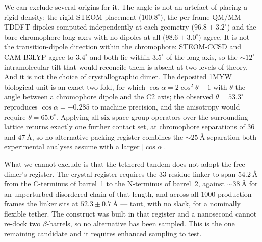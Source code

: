 \documentclass[journal=jpcbfk, manuscript=article, layout=twocolumn, doi=true]{achemso}
\begin{document}
We can exclude several origins for it. The angle is not an artefact of placing
a rigid density: the rigid STEOM placement ($100.8^{\circ}$), the per-frame
QM/MM TDDFT dipoles computed independently at each geometry
($96.8 \pm 3.2^{\circ}$) and the bare chromophore long axes with no dipoles at
all ($98.6 \pm 3.0^{\circ}$) agree. It is not the transition-dipole direction
within the chromophore: STEOM-CCSD and CAM-B3LYP agree to $3.4^{\circ}$ and
both lie within $3.5^{\circ}$ of the long axis, so the $\sim\!12^{\circ}$
intramolecular tilt that would reconcile them is absent at two levels of
theory. And it is not the choice of crystallographic dimer. The deposited
1MYW biological unit is an exact two-fold, for which
$\cos\alpha = 2\cos^{2}\theta - 1$ with $\theta$ the angle between a
chromophore dipole and the C2 axis; the observed $\theta = 53.3^{\circ}$
reproduces $\cos\alpha = -0.285$ to machine precision, and the anisotropy would
require $\theta = 65.6^{\circ}$. Applying all six space-group operators over
the surrounding lattice returns exactly one further contact set, at
chromophore separations of $36$ and $47~\text{\AA}$, so no alternative packing
register combines the $\sim\!25~\text{\AA}$ separation both experimental
analyses assume with a larger $|\cos\alpha|$.

What we cannot exclude is that the tethered tandem does not adopt the free
dimer's register. The crystal register requires the $33$-residue linker to
span $54.2~\text{\AA}$ from the C-terminus of barrel~1 to the N-terminus of
barrel~2, against $\sim\!38~\text{\AA}$ for an unperturbed disordered chain of
that length, and across all $1000$ production frames the linker sits at
$52.3 \pm 0.7~\text{\AA}$ --- taut, with no slack, for a nominally flexible
tether. The construct was built in that register and a nanosecond cannot
re-dock two $\beta$-barrels, so no alternative has been sampled. This is the
one remaining candidate and it requires enhanced sampling to test.
\end{document}
